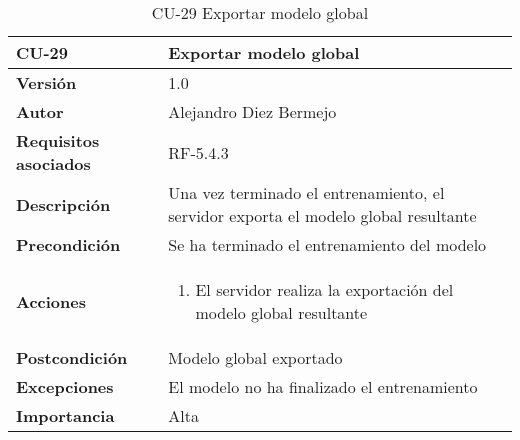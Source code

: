 \begin{table}[p]
	\centering
	\begin{tabularx}{\linewidth}{ p{} p{} }
		\toprule
		\textbf{CU-29}    & \textbf{Exportar modelo global}\\
		\toprule
		\textbf{Versión}              & 1.0    \\
		\textbf{Autor}                & Alejandro Diez Bermejo \\
		\textbf{Requisitos asociados} & RF-5.4.3 \\
		\textbf{Descripción}          & Una vez terminado el entrenamiento, el servidor exporta el modelo global resultante \\
        \textbf{Precondición}         & Se ha terminado el entrenamiento del modelo \\
		\textbf{Acciones}             &
		\begin{enumerate}
			\def\labelenumi{\arabic{enumi}.}
			\tightlist
            \item El servidor realiza la exportación del modelo global resultante
		\end{enumerate}\\
		\textbf{Postcondición}        & Modelo global exportado \\
		\textbf{Excepciones}          & El modelo no ha finalizado el entrenamiento \\
		\textbf{Importancia}          & Alta \\
		\bottomrule
	\end{tabularx}
	\caption{CU-29 Exportar modelo global}
\end{table}

